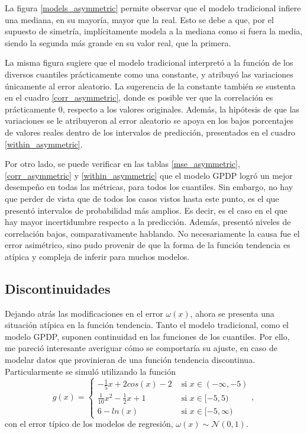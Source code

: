 La figura \ref{models_asymmetric} permite observar que el modelo tradicional infiere una mediana, en su mayor\'ia, mayor que la real. Esto se debe a que, por el supuesto de simetr\'ia, impl\'icitamente modela a la mediana como si fuera la media, siendo la segunda m\'as grande en su valor real, que la primera. 

La misma figura sugiere que el modelo tradicional interpret\'o a la funci\'on de los diversos cuantiles pr\'acticamente como una constante, y atribuy\'o las variaciones \'unicamente al error aleatorio. La sugerencia de la constante tambi\'en se sustenta en el cuadro \ref{corr_asymmetric}, donde es posible ver que la correlaci\'on es pr\'acticamente 0, respecto a los valores originales. Adem\'as, la hip\'otesis de que las variaciones se le atribuyeron al error aleatorio se apoya en los bajos porcentajes de valores reales dentro de los intervalos de predicci\'on, presentados en el cuadro \ref{within_asymmetric}.

Por otro lado, se puede verificar en las tablas \ref{mse_asymmetric}, \ref{corr_asymmetric} y \ref{within_asymmetric} que el modelo GPDP logr\'o un mejor desempeño en todas las m\'etricas, para todos los cuantiles. Sin embargo, no hay que perder de vista que de todos los casos vistos hasta este punto, es el que present\'o intervalos de probabilidad m\'as amplios. Es decir, es el caso en el que hay mayor incertidumbre respecto a la predicci\'on. Adem\'as, present\'o niveles de correlaci\'on bajos, comparativamente hablando. No necesariamente la causa fue el error asim\'etrico, sino pudo provenir de que la forma de la funci\'on tendencia es at\'ipica y compleja de inferir para muchos modelos.

\subsection{Discontinuidades}

Dejando atr\'as las modificaciones en el error $\omega(x)$, ahora se presenta una situaci\'on at\'ipica en la funci\'on tendencia. Tanto el modelo tradicional, como el modelo GPDP, suponen continuidad en las funciones de los cuantiles. Por ello, me pareci\'o interesante averiguar c\'omo se comportar\'ia su ajuste, en caso de modelar datos que provinieran de una funci\'on tendencia discontinua. Particularmente se simul\'o utilizando la funci\'on
\begin{equation*}
g(x) = 
\begin{cases}
   - \frac{1}{5} x + 2cos(x) - 2 &\text{ si } x \in (-\infty, -5) \\
   \frac{1}{10} x^2 - \frac{1}{2}x + 1 &\text{ si } x \in [-5, 5) \\
   6 - ln(x) &\text{ si } x \in [-5, \infty)
\end{cases},
\end{equation*}
con el error t\'ipico de los modelos de regresi\'on, $\omega(x) \sim \mathcal{N}(0,1)$.

